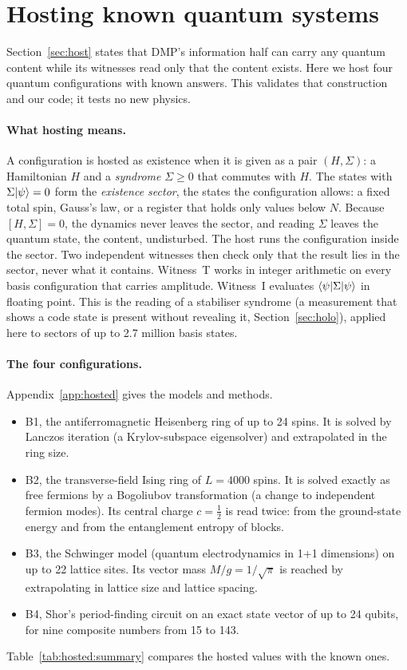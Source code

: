 \section{Hosting known quantum systems}\label{sec:hosted}

Section~\ref{sec:host} states that DMP's information half can carry any quantum content while its witnesses read only that the content
exists. Here we host four quantum configurations with known answers. This validates that construction and our code; it tests no new
physics.

\paragraph{What hosting means.} A configuration is hosted as existence when it is given as a pair $(H,\Sigma)$: a Hamiltonian $H$ and a
\emph{syndrome} $\Sigma\ge0$ that commutes with $H$. The states with $\Sigma\lvert \psi\rangle=0$ form the \emph{existence sector}, the states the
configuration allows: a fixed total spin, Gauss's law, or a register that holds only values below $N$. Because $[H,\Sigma]=0$, the
dynamics never leaves the sector, and reading $\Sigma$ leaves the quantum state, the content, undisturbed. The host runs the configuration
inside the sector. Two independent witnesses then check only that the result lies in the sector, never what it contains. Witness~T works
in integer arithmetic on every basis configuration that carries amplitude. Witness~I evaluates $\langle \psi\rvert\Sigma\lvert \psi\rangle$ in floating
point. This is the reading of a stabiliser syndrome (a measurement that shows a code state is present without revealing it,
Section~\ref{sec:holo}), applied here to sectors of up to 2.7 million basis states.

\paragraph{The four configurations.} Appendix~\ref{app:hosted} gives the models and methods.
\begin{itemize}[nosep]
\item B1, the antiferromagnetic Heisenberg ring of up to 24 spins. It is solved by Lanczos iteration (a Krylov-subspace eigensolver) and
extrapolated in the ring size.
\item B2, the transverse-field Ising ring of $L=4000$ spins. It is solved exactly as free fermions by a Bogoliubov transformation (a change to
independent fermion modes). Its central charge $c=\tfrac12$ is read twice: from the ground-state energy and from the entanglement entropy
of blocks.
\item B3, the Schwinger model (quantum electrodynamics in 1+1 dimensions) on up to 22 lattice sites. Its vector mass $M/g=1/\sqrt\pi$
\cite{schwinger1962} is reached by extrapolating in lattice size and lattice spacing.
\item B4, Shor's period-finding circuit \cite{shor1997} on an exact state vector of up to 24 qubits, for nine composite numbers from 15
to 143.
\end{itemize}
Table~\ref{tab:hosted:summary} compares the hosted values with the known ones.

